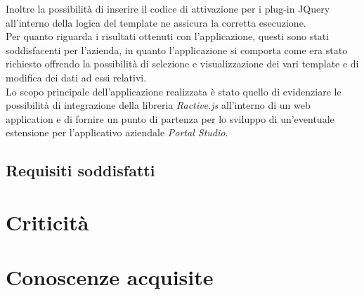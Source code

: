 Inoltre la possibilità di inserire il codice di attivazione per i plug-in JQuery all'interno della logica del template ne assicura la corretta esecuzione.\\
Per quanto riguarda i risultati ottenuti con l'applicazione, questi sono stati soddisfacenti per l'azienda, in quanto l'applicazione si comporta come era stato richiesto offrendo la possibilità di selezione e visualizzazione dei vari template e di modifica dei dati ad essi relativi.\\
Lo scopo principale dell'applicazione realizzata è stato quello di evidenziare le possibilità di integrazione della libreria \textit{Ractive.js} all'interno di un web application e di fornire un punto di partenza per lo sviluppo di un'eventuale estensione per l'applicativo aziendale \textit{Portal Studio}.
 
\subsection{Requisiti soddisfatti}
\section{Criticità}

\section{Conoscenze acquisite}
